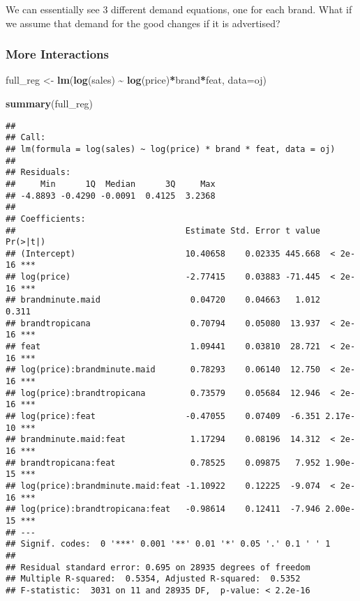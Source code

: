 \documentclass[
]{article}
\newenvironment{Shaded}{\begin{snugshade}}{\end{snugshade}}
\newcommand{\AttributeTok}[1]{\textcolor[rgb]{0.13,0.29,0.53}{#1}}
\newcommand{\FunctionTok}[1]{\textcolor[rgb]{0.13,0.29,0.53}{\textbf{#1}}}
\newcommand{\NormalTok}[1]{#1}
\newcommand{\OtherTok}[1]{\textcolor[rgb]{0.56,0.35,0.01}{#1}}
\newcommand{\SpecialCharTok}[1]{\textcolor[rgb]{0.81,0.36,0.00}{\textbf{#1}}}
\begin{document}
We can essentially see 3 different demand equations, one for each brand.
What if we assume that demand for the good changes if it is advertised?

\subsubsection{More Interactions}\label{more-interactions}

\begin{Shaded}
\begin{Highlighting}[]
\NormalTok{full\_reg }\OtherTok{\textless{}{-}} \FunctionTok{lm}\NormalTok{(}\FunctionTok{log}\NormalTok{(sales) }\SpecialCharTok{\textasciitilde{}} \FunctionTok{log}\NormalTok{(price)}\SpecialCharTok{*}\NormalTok{brand}\SpecialCharTok{*}\NormalTok{feat, }\AttributeTok{data=}\NormalTok{oj)}

\FunctionTok{summary}\NormalTok{(full\_reg)}
\end{Highlighting}
\end{Shaded}

\begin{verbatim}
## 
## Call:
## lm(formula = log(sales) ~ log(price) * brand * feat, data = oj)
## 
## Residuals:
##     Min      1Q  Median      3Q     Max 
## -4.8893 -0.4290 -0.0091  0.4125  3.2368 
## 
## Coefficients:
##                                  Estimate Std. Error t value Pr(>|t|)    
## (Intercept)                      10.40658    0.02335 445.668  < 2e-16 ***
## log(price)                       -2.77415    0.03883 -71.445  < 2e-16 ***
## brandminute.maid                  0.04720    0.04663   1.012    0.311    
## brandtropicana                    0.70794    0.05080  13.937  < 2e-16 ***
## feat                              1.09441    0.03810  28.721  < 2e-16 ***
## log(price):brandminute.maid       0.78293    0.06140  12.750  < 2e-16 ***
## log(price):brandtropicana         0.73579    0.05684  12.946  < 2e-16 ***
## log(price):feat                  -0.47055    0.07409  -6.351 2.17e-10 ***
## brandminute.maid:feat             1.17294    0.08196  14.312  < 2e-16 ***
## brandtropicana:feat               0.78525    0.09875   7.952 1.90e-15 ***
## log(price):brandminute.maid:feat -1.10922    0.12225  -9.074  < 2e-16 ***
## log(price):brandtropicana:feat   -0.98614    0.12411  -7.946 2.00e-15 ***
## ---
## Signif. codes:  0 '***' 0.001 '**' 0.01 '*' 0.05 '.' 0.1 ' ' 1
## 
## Residual standard error: 0.695 on 28935 degrees of freedom
## Multiple R-squared:  0.5354, Adjusted R-squared:  0.5352 
## F-statistic:  3031 on 11 and 28935 DF,  p-value: < 2.2e-16
\end{verbatim}
\end{document}

